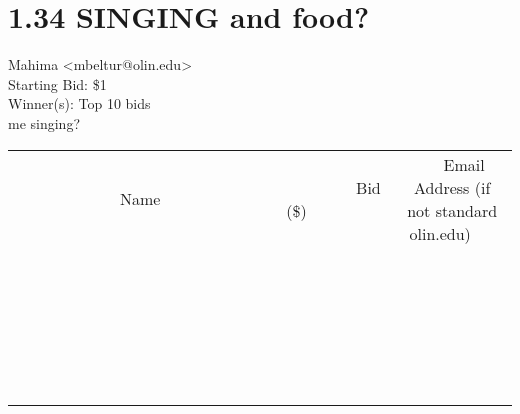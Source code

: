 \documentclass[11pt]{article}
\begin{document}
					\section*{1.34 SINGING and food?}
					Mahima <mbeltur@olin.edu> \\
					Starting Bid: \$1 \\
					Winner(s): Top 10 bids \\
					me singing? \\
					[6ex]
					\begin{tabular}{c c c}
						~~~~~~~~~~~~~Name~~~~~~~~~~~~~ & ~~~~~~~~~Bid (\$)~~~~~~~~~ & ~~~Email Address (if not standard olin.edu)~~~ \\
				
 & & \\
\hline
 & & \\
\hline
 & & \\
\hline
 & & \\
\hline
 & & \\
\hline
 & & \\
\hline
 & & \\
\hline
 & & \\
\hline
 & & \\
\hline
 & & \\
\hline
 & & \\
\hline
 & & \\
\hline
 & & \\
\hline
 & & \\
\hline
 & & \\
\hline
 & & \\
\hline
 & & \\
\hline
 & & \\
\hline
 & & \\
\hline
 & & \\
\hline
 & & \\
\hline
 & & \\
\hline
 & & \\
\hline
 & & \\
\hline
 & & \\
\hline
 & & \\
\hline
					\end{tabular}
					\clearpage
				
\end{document}
